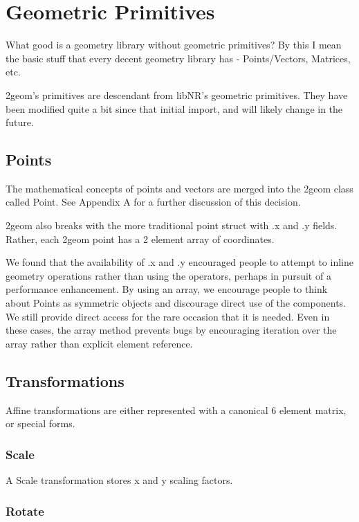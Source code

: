 \documentclass{book}
\newcommand{\code}[1]{\textsf{#1}}
\begin{document}
\chapter{Geometric Primitives}

What good is a geometry library without geometric primitives?  By this
I mean the basic stuff that every decent geometry library has -
Points/Vectors, Matrices, etc.

2geom's primitives are descendant from libNR's geometric primitives.
They have been modified quite a bit since that initial import, and
will likely change in the future.

\section{Points}

The mathematical concepts of points and vectors are merged into the
2geom class called \code{Point}.  See Appendix A for a further
discussion of this decision.

2geom also breaks with the more traditional point \code{struct} with
\code{.x} and \code{.y} fields.  Rather, each 2geom point has a 2
element array of coordinates.

We found that the availability of \code{.x} and \code{.y} encouraged
people to attempt to inline geometry operations rather than using the
operators, perhaps in pursuit of a performance enhancement.  By using
an array, we encourage people to think about \code{Point}s as
symmetric objects and discourage direct use of the components.  We
still provide direct access for the rare occasion that it is needed.
Even in these cases, the array method prevents bugs by encouraging
iteration over the array rather than explicit element reference.

\section{Transformations}

Affine transformations are either represented with a canonical 6
element matrix, or special forms.

\subsection{Scale}

A \code{Scale} transformation stores x and y scaling factors.

\subsection{Rotate}
\end{document}
